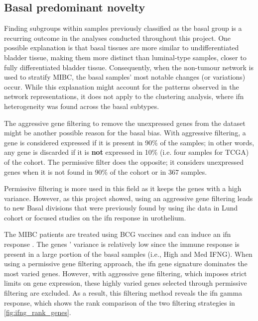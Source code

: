 \subsection*{Basal predominant novelty}

Finding subgroups within samples previously classified as the basal group is a recurring outcome in the analyses conducted throughout this project. One possible explanation is that basal tissues are more similar to undifferentiated bladder tissue, making them more distinct than luminal-type samples, closer to fully differentiated bladder tissue. Consequently, when the non-tumour network is used to stratify MIBC, the basal samples' most notable changes (or variations) occur. While this explanation might account for the patterns observed in the network representations, it does not apply to the clustering analysis, where \acrshort{ifn} heterogeneity was found across the basal subtypes.

The aggressive gene filtering to remove the unexpressed genes from the dataset might be another possible reason for the basal bias. With aggressive filtering, a gene is considered expressed if it is present in 90\% of the samples; in other words, any gene is discarded if it is \textbf{not} expressed in 10\% (i.e. four samples for TCGA) of the cohort. The permissive filter does the opposite; it considers unexpressed genes when it is not found in 90\% of the cohort or in 367 samples. 

Permissive filtering is more used in this field as it keeps the genes with a high variance. However, as this project showed, using an aggressive gene filtering leads to new Basal divisions that were previously found by using \acrshort{ihc} data in Lund cohort \citep{Marzouka2018-ge} or focused studies on the \acrshort{ifn} response in urothelium.

The MIBC patients are treated using BCG vaccines and can induce an \acrshort{ifn} response \citep{Baker2022-bj}. The genes ' variance is relatively low since the immune response is present in a large portion of the basal samples (i.e., High and Med IFNG). When using a permissive gene filtering approach, the \acrshort{ifn} gene signature dominates the most varied genes. However, with aggressive gene filtering, which imposes strict limits on gene expression, these highly varied genes selected through permissive filtering are excluded. As a result, this filtering method reveals the \acrlong{ifn} gamma response, which shows the rank comparison of the two filtering strategies in \cref{fig:ifng_rank_genes}.

